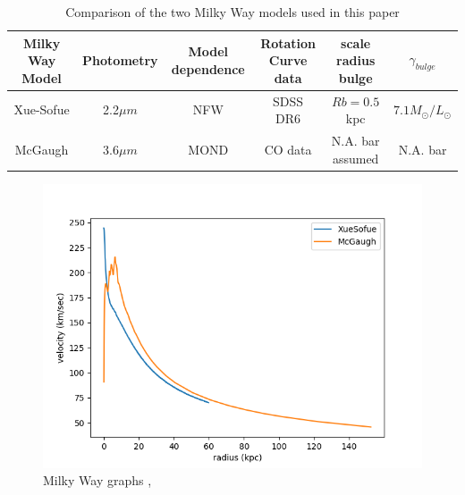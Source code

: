 \documentclass[reprint,%
 amsmath,amssymb,
 aps,
]{revtex4-1}
\begin{document}
  
  \begin{table}[]
      \centering
       \caption{Comparison of the two Milky Way models used in this paper}
      \label{tab:MWcompare}
       \begin{tabular}{|c|c|c|c|c|c|}
      \hline
        Milky Way Model & Photometry                        & Model dependence  & Rotation Curve data & scale radius bulge &$\gamma_{bulge}$\\
 \hline
Xue-Sofue     
&  2.2$ \mu m$
& NFW \cite{1996ApJ...462..563N}     
&SDSS DR6  \cite{Xue}       
& $Rb = 0.5$ kpc    
&$  7.1 M_\odot /L_\odot$  \\
  \hline
 McGaugh       
 & 3.6$\mu m$ 
 &MOND \cite{Milgrom}
 & CO data  \cite{2006ApJ...641..938L}                            
 &  N.A.  bar assumed
 & N.A. bar\\
         \hline
      \end{tabular}
     
  \end{table}
  
  \begin{figure}
    \centering
    \includegraphics[width=\linewidth]{figures/MW_Data.png}
 \caption{ Milky Way graphs  \cite{sofue2009unified}, \cite{McGaugh_2019} }
   \label{fig:mwSofuevMcGaugh}
\end{figure}
\end{document}
